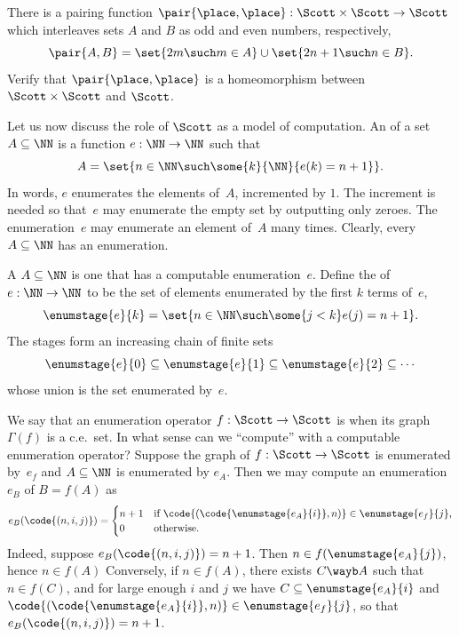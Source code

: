 \begin{exercise}
  There is a pairing function $\pair{\place, \place} : \Scott \times
  \Scott \to \Scott$ which interleaves sets $A$ and $B$ as odd and even
  numbers, respectively,
  \begin{equation*}
    \pair{A, B} = \set{2 m \such m \in A} \cup \set{2 n + 1 \such n \in B}.
  \end{equation*}
  Verify that $\pair{\place, \place}$ is a homeomorphism between $\Scott \times \Scott$ and
  $\Scott$.
\end{exercise}

Let us now discuss the role of $\Scott$ as a model of computation. An
 of a set $A \subseteq \NN$ is a function $e : \NN
\to \NN$ such that
%
\begin{equation*}
  A = \set{n \in \NN \such \some{k}{\NN}{e(k) = n + 1}}.
\end{equation*}
%
In words, $e$ enumerates the elements of~$A$, incremented by $1$. The
increment is needed so that~$e$ may enumerate the empty set by
outputting only zeroes. The enumeration~$e$ may enumerate an element of~$A$ many times.
Clearly, every $A \subseteq \NN$ has an enumeration.

A  $A \subseteq \NN$ is one that has a computable enumeration~$e$.
Define the  of~$e : \NN \to \NN$ to be the set of elements enumerated by the first $k$ terms
of~$e$,
%
\begin{equation*}
  \enumstage{e}{k} = \set{n \in \NN \such \some{j < k} e(j) = n + 1}.
\end{equation*}
%
The stages form an increasing chain of finite sets
%
\begin{equation*}
  \enumstage{e}{0} \subseteq
  \enumstage{e}{1} \subseteq
  \enumstage{e}{2} \subseteq
  \cdots
\end{equation*}
%
whose union is the set enumerated by~$e$.

We say that an enumeration operator $f : \Scott \to \Scott$ is
 when its graph $\Gamma(f)$ is a c.e.~set. In what
sense can we ``compute'' with a computable enumeration operator?
Suppose the graph of $f : \Scott \to \Scott$ is enumerated by~$e_f$
and $A \subseteq \NN$ is enumerated by $e_A$. Then we may compute an
enumeration $e_B$ of $B = f(A)$ as
%
\begin{equation*}
  e_B(\code{(n, i, j)}) =
  \begin{cases}
    n + 1 & \text{if $\code{(\code{\enumstage{e_A}{i}}, n)} \in
      \enumstage{e_f}{j}$,}\\
    0 & \text{otherwise}.
  \end{cases}
\end{equation*}
%
Indeed, suppose $e_B(\code{(n,i,j)}) = n + 1$. Then $n \in
f(\enumstage{e_A}{j})$, hence $n \in f(A)$ Conversely, if $n \in
f(A)$, there exists $C \wayb A$ such that $n \in f(C)$, and for large
enough $i$ and $j$ we have $C \subseteq \enumstage{e_A}{i}$ and
$\code{(\code{\enumstage{e_A}{i}}, n)} \in \enumstage{e_f}{j}$, so
that $e_B(\code{(n, i, j)}) = n + 1$.

